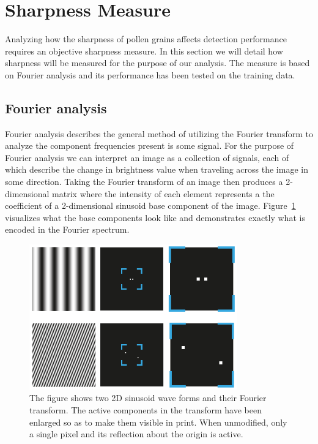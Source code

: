 
\section{Sharpness Measure}\label{sec:method-sharpness}
Analyzing how the sharpness of pollen grains affects detection performance requires an objective sharpness measure.
In this section we will detail how sharpness will be measured for the purpose of our analysis.
The measure is based on Fourier analysis and its performance has been tested on the training data.

\subsection{Fourier analysis}
Fourier analysis describes the general method of utilizing the Fourier transform to analyze the component frequencies present is some signal.
For the purpose of Fourier analysis we can interpret an image as a collection of signals, each of which describe the change in brightness value when traveling across the image in some direction.
Taking the Fourier transform of an image then produces a 2-dimensional matrix where the intensity of each element represents a the coefficient of a 2-dimensional sinusoid base component of the image.
Figure~\ref{fig:fourier-sinusoid} visualizes what the base components look like and demonstrates exactly what is encoded in the Fourier spectrum.

\begin{figure}[htbp]
  \centering
  \includegraphics[width=0.8\textwidth]{figs/fourier/fourier-sinusoid.pdf}
  \caption[Fourier transform of sinusoid]{The figure shows two 2D sinusoid wave forms and their Fourier transform. The active components in the transform have been enlarged so as to make them visible in print. When unmodified, only a single pixel and its reflection about the origin is active.}\label{fig:fourier-sinusoid}
\end{figure}

